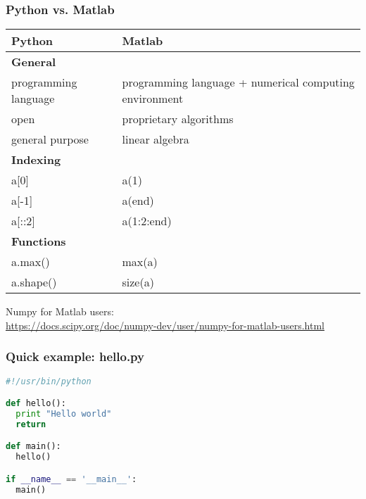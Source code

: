 \begin{frame}[fragile]
\frametitle{Python vs. Matlab}
\footnotesize

\begin{table}
\scriptsize
\begin{tabular}{p{}p{}}
\toprule
Python  	  				& Matlab\\
\midrule
\textbf{General}			& \\
programming language		& programming language + numerical computing environment\\
open						& proprietary algorithms\\
general purpose				& linear algebra\\
\midrule
\textbf{Indexing} 			& 	\\
a[0]						& a(1) \\
a[-1]						& a(end)\\
a[::2]						& a(1:2:end)\\
\midrule
\textbf{Functions}			& \\
a.max()						& max(a)\\
a.shape()					& size(a)\\
\bottomrule
\end{tabular}
\end{table}

\vfill

Numpy for Matlab users:\\
\url{https://docs.scipy.org/doc/numpy-dev/user/numpy-for-matlab-users.html}

\end{frame}


\begin{frame}[fragile]
\frametitle{Quick example: hello.py}
\huge

\faLaptop

\begin{lstlisting}[language=python]
#!/usr/bin/python

def hello():
  print "Hello world"
  return

def main():
  hello()

if __name__ == '__main__':
  main()
\end{lstlisting}

\end{frame}


